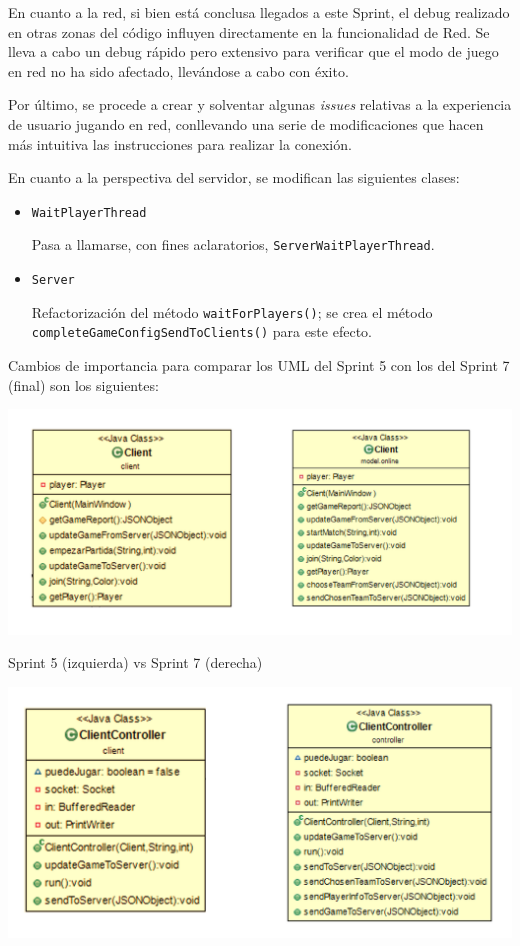 \documentclass[../DocumentoOficial.tex]{subfiles}
\begin{document}
\begin{sprint}[7]

En cuanto a la red, si bien está conclusa llegados a este Sprint, el debug realizado en otras zonas del código influyen directamente en la funcionalidad de Red. Se lleva a cabo un debug rápido pero extensivo para verificar que el modo de juego en red no ha sido afectado, llevándose a cabo con éxito.

Por último, se procede a crear y solventar algunas \textit{issues} relativas a la experiencia de usuario jugando en red, conllevando una serie de modificaciones que hacen más intuitiva las instrucciones para realizar la conexión.

En cuanto a la perspectiva del servidor, se modifican las siguientes clases:

\begin{itemize}

\item \texttt{WaitPlayerThread}

Pasa a llamarse, con fines aclaratorios, \texttt{ServerWaitPlayerThread}.

\item \texttt{Server}

Refactorización del método \texttt{waitForPlayers()}; se crea el método \texttt{completeGameConfigSendToClients()} para este efecto.

\end{itemize}

Cambios de importancia para comparar los UML del Sprint 5 con los del Sprint 7 (final) son los siguientes:

\begin{center}
\includegraphics[scale=0.3]{Client-evol.png}

Sprint 5 (izquierda) vs Sprint 7 (derecha)
\end{center}

\begin{center}
\includegraphics[scale=0.3]{ClientController-evol.png} 


\end{center}
\end{sprint}
\end{document}
